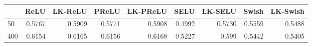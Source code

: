 \begin{tabular}{lrrrrrrrr}
	\toprule
	{} &    ReLU &   LK-ReLU &   PReLU &  LK-PReLU &    SELU &  LK-SELU &   Swish &  LK-Swish \\
	\midrule
	50 &  0.5767 &  0.5909 &  0.5771 &  0.5908 &  0.4992 &  0.5730 &  0.5559 &  0.5488 \\
	400 &  0.6154 &  0.6165 &  0.6156 &  0.6168 &  0.5227 &  0.599 &  0.5442 &  0.5405 \\
	\bottomrule
\end{tabular}